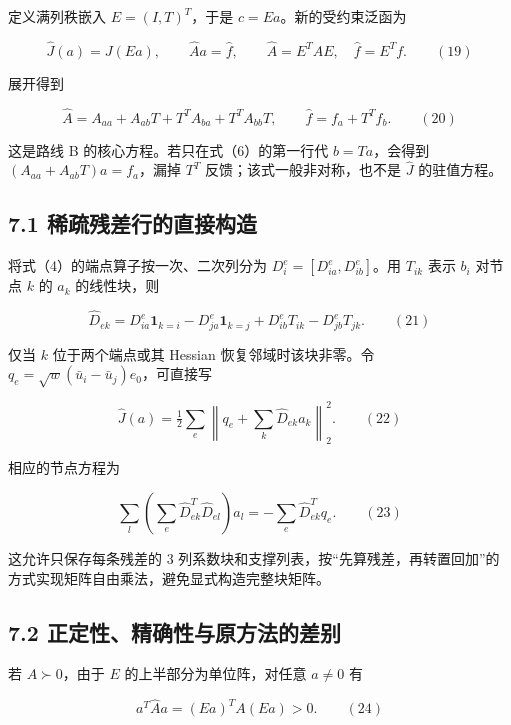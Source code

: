 \documentclass[
  11pt,
  a4paper,
]{article}
\begin{document}
定义满列秩嵌入 \(E=(I,T)^T\)，于是 \(c=Ea\)。新的受约束泛函为

\[
\widehat J(a)=J(Ea),\qquad
\widehat A a=\widehat f,\qquad
\widehat A=E^TAE,\quad \widehat f=E^Tf. \qquad(19)
\]

展开得到

\[
\widehat A=A_{aa}+A_{ab}T+T^TA_{ba}+T^TA_{bb}T,
\qquad \widehat f=f_a+T^Tf_b. \qquad(20)
\]

这是路线 B 的核心方程。若只在式（6）的第一行代 \(b=Ta\)，会得到
\((A_{aa}+A_{ab}T)a=f_a\)，漏掉 \(T^T\) 反馈；该式一般非对称，也不是
\(\widehat J\) 的驻值方程。

\hypertarget{ux7a00ux758fux6b8bux5deeux884cux7684ux76f4ux63a5ux6784ux9020}{%
\subsection{7.1
稀疏残差行的直接构造}\label{ux7a00ux758fux6b8bux5deeux884cux7684ux76f4ux63a5ux6784ux9020}}

将式（4）的端点算子按一次、二次列分为 \(D_i^e=[D_{ia}^e,D_{ib}^e]\)。用
\(T_{ik}\) 表示 \(b_i\) 对节点 \(k\) 的 \(a_k\) 的线性块，则

\[
\widehat D_{ek}=D_{ia}^e\mathbf1_{k=i}-D_{ja}^e\mathbf1_{k=j}
+D_{ib}^eT_{ik}-D_{jb}^eT_{jk}. \qquad(21)
\]

仅当 \(k\) 位于两个端点或其 Hessian 恢复邻域时该块非零。令
\(q_e=\sqrt w(\bar u_i-\bar u_j)e_0\)，可直接写

\[
\widehat J(a)=\tfrac12\sum_e\left\|q_e+\sum_k\widehat D_{ek}a_k\right\|_2^2. \qquad(22)
\]

相应的节点方程为

\[
\sum_l\left(\sum_e\widehat D_{ek}^T\widehat D_{el}\right)a_l
=-\sum_e\widehat D_{ek}^Tq_e. \qquad(23)
\]

这允许只保存每条残差的 \(3\)
列系数块和支撑列表，按``先算残差，再转置回加''的方式实现矩阵自由乘法，避免显式构造完整块矩阵。

\hypertarget{ux6b63ux5b9aux6027ux7cbeux786eux6027ux4e0eux539fux65b9ux6cd5ux7684ux5deeux522b}{%
\subsection{7.2
正定性、精确性与原方法的差别}\label{ux6b63ux5b9aux6027ux7cbeux786eux6027ux4e0eux539fux65b9ux6cd5ux7684ux5deeux522b}}

若 \(A\succ0\)，由于 \(E\) 的上半部分为单位阵，对任意 \(a\ne0\) 有

\[
a^T\widehat Aa=(Ea)^TA(Ea)>0. \qquad(24)
\]
\end{document}

